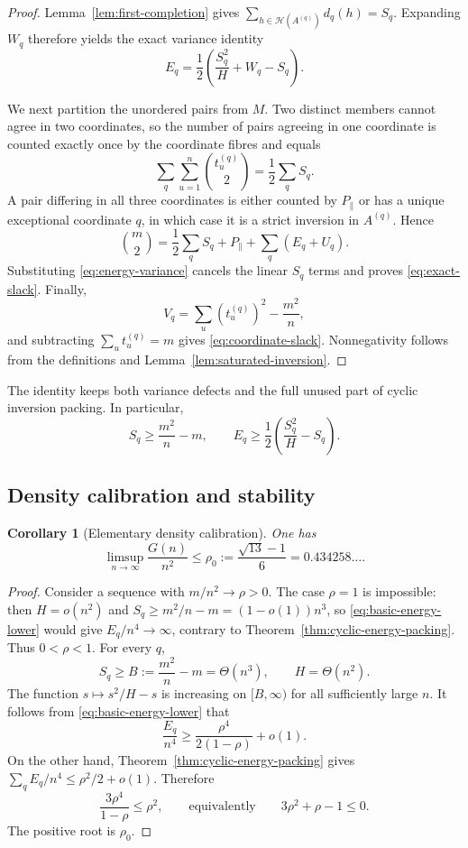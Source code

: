 \documentclass[11pt]{article}
\numberwithin{equation}{section}
\newtheorem{corollary}[theorem]{Corollary}
\theoremstyle{definition}
\theoremstyle{remark}
\newcommand{\Hcal}{\mathcal H}
\begin{document}
\begin{proof}
Lemma~\ref{lem:first-completion} gives
$\sum_{h\in\Hcal(A^{(q)})}d_q(h)=S_q$.  Expanding $W_q$ therefore yields the
exact variance identity
\begin{equation}\label{eq:energy-variance}
 E_q=\frac12\left(\frac{S_q^2}{H}+W_q-S_q\right).
\end{equation}

We next partition the unordered pairs from $M$.  Two distinct members cannot
agree in two coordinates, so the number of pairs agreeing in one coordinate
is counted exactly once by the coordinate fibres and equals
\[
 \sum_q\sum_{u=1}^n\binom{t_u^{(q)}}2=\frac12\sum_q S_q.
\]
A pair differing in all three coordinates is either counted by
$P_{\parallel}$ or has a unique exceptional coordinate $q$, in which case it
is a strict inversion in $A^{(q)}$.  Hence
\begin{equation}\label{eq:pair-partition}
 \binom m2=\frac12\sum_qS_q+P_{\parallel}
 +\sum_q(E_q+U_q).
\end{equation}
Substituting \eqref{eq:energy-variance} cancels the linear $S_q$ terms and
proves \eqref{eq:exact-slack}.  Finally,
\[
 V_q=\sum_u(t_u^{(q)})^2-\frac{m^2}{n},
\]
and subtracting $\sum_u t_u^{(q)}=m$ gives
\eqref{eq:coordinate-slack}.  Nonnegativity follows from the definitions and
Lemma~\ref{lem:saturated-inversion}.
\end{proof}

The identity keeps both variance defects and the full unused part of cyclic
inversion packing.  In particular,
\begin{equation}\label{eq:basic-energy-lower}
 S_q\ge \frac{m^2}{n}-m,\qquad
 E_q\ge\frac12\left(\frac{S_q^2}{H}-S_q\right).
\end{equation}

\subsection{Density calibration and stability}

\begin{corollary}[Elementary density calibration]\label{cor:density-calibration}
One has
\[
 \limsup_{n\to\infty}\frac{G(n)}{n^2}
 \le \rho_0:=\frac{\sqrt{13}-1}{6}=0.434258\ldots.
\]
\end{corollary}

\begin{proof}
Consider a sequence with $m/n^2\to\rho>0$.  The case $\rho=1$ is impossible:
then $H=o(n^2)$ and $S_q\ge m^2/n-m=(1-o(1))n^3$, so
\eqref{eq:basic-energy-lower} would give $E_q/n^4\to\infty$, contrary to
Theorem~\ref{thm:cyclic-energy-packing}.  Thus $0<\rho<1$.  For every $q$,
\[
 S_q\ge B:=\frac{m^2}{n}-m=\Theta(n^3),\qquad H=\Theta(n^2).
\]
The function $s\mapsto s^2/H-s$ is increasing on $[B,\infty)$ for all
sufficiently large $n$.  It follows from \eqref{eq:basic-energy-lower} that
\[
 \frac{E_q}{n^4}\ge\frac{\rho^4}{2(1-\rho)}+o(1).
\]
On the other hand, Theorem~\ref{thm:cyclic-energy-packing} gives
$\sum_qE_q/n^4\le\rho^2/2+o(1)$.  Therefore
\[
 \frac{3\rho^4}{1-\rho}\le\rho^2,
 \qquad\text{equivalently}\qquad 3\rho^2+\rho-1\le0.
\]
The positive root is $\rho_0$.
\end{proof}
\end{document}
